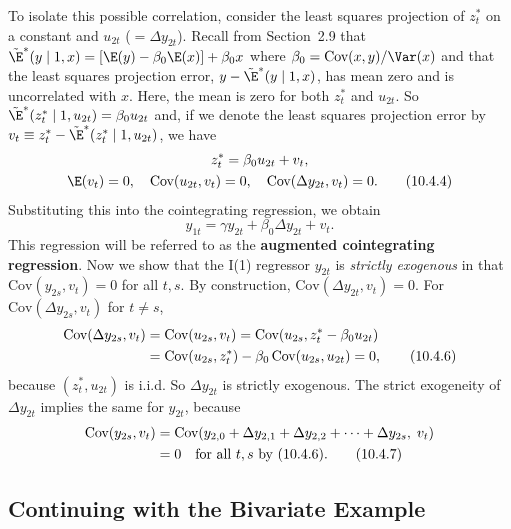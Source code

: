 To isolate this possible correlation, consider the least squares projection of $z_t^*$
on a constant and $u_{2t}$ ($= \Delta y_{2t}$). Recall from Section~2.9 that
$\tilde{\E}^*(y \mid 1, x) = [\E(y) - \beta_0 \E(x)] + \beta_0 x$
where $\beta_0 = \text{Cov}(x, y)/\Var(x)$ and that the least squares
projection error, $y - \tilde{\E}^*(y \mid 1, x)$, has mean zero and is uncorrelated with $x$. Here,
the mean is zero for both $z_t^*$ and $u_{2t}$. So
$\tilde{\E}^*(z_t^* \mid 1, u_{2t}) = \beta_0 u_{2t}$ and, if we denote
the least squares projection error by $v_t \equiv z_t^* - \tilde{\E}^*(z_t^* \mid 1, u_{2t})$, we have
\begin{gather}
  z_t^* = \beta_0 u_{2t} + v_t,
  \notag \\
  \E(v_t) = 0, \quad
  \text{Cov}(u_{2t}, v_t) = 0, \quad
  \text{Cov}(\Delta y_{2t}, v_t) = 0.
  \label{eq:10.4.4} \tag{10.4.4}
\end{gather}
Substituting this into the cointegrating regression, we obtain
\begin{equation}
  y_{1t} = \gamma y_{2t} + \beta_0 \Delta y_{2t} + v_t.
  \label{eq:10.4.5} \tag{10.4.5}
\end{equation}
This regression will be referred to as the \textbf{augmented cointegrating regression}.
Now we show that the I(1) regressor $y_{2t}$ is \emph{strictly exogenous} in that
$\text{Cov}(y_{2s}, v_t) = 0$ for all $t, s$. By construction,
$\text{Cov}(\Delta y_{2t}, v_t) = 0$. For $\text{Cov}(\Delta y_{2s}, v_t)$ for $t \neq s$,
\begin{align}
  \text{Cov}(\Delta y_{2s}, v_t)
  &= \text{Cov}(u_{2s}, v_t)
   = \text{Cov}(u_{2s}, z_t^* - \beta_0 u_{2t})
  \notag \\
  &= \text{Cov}(u_{2s}, z_t^*) - \beta_0 \,\text{Cov}(u_{2s}, u_{2t}) = 0,
  \label{eq:10.4.6} \tag{10.4.6}
\end{align}
because $(z_t^*, u_{2t})$ is i.i.d. So $\Delta y_{2t}$ is strictly exogenous. The strict exogeneity of
$\Delta y_{2t}$ implies the same for $y_{2t}$, because
\begin{align}
  \text{Cov}(y_{2s}, v_t)
  &= \text{Cov}(y_{2,0} + \Delta y_{2,1} + \Delta y_{2,2} + \cdots + \Delta y_{2s},\; v_t)
  \notag \\
  &= 0 \quad \text{for all } t, s \text{ by (10.4.6)}.
  \label{eq:10.4.7} \tag{10.4.7}
\end{align}

\subsection*{Continuing with the Bivariate Example}

